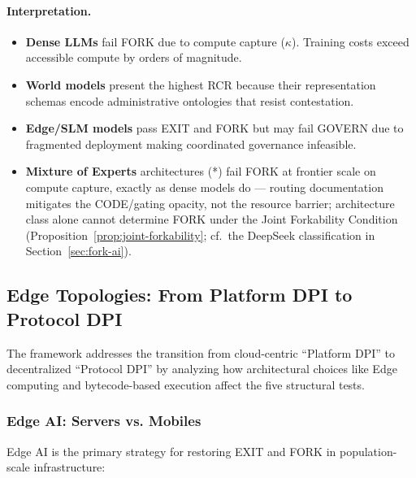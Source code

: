\documentclass{article}
\theoremstyle{definition}
\begin{document}
\paragraph{Interpretation.}
\begin{itemize}[noitemsep]
    \item \textbf{Dense LLMs} fail FORK due to compute capture ($\kappa$). Training costs exceed accessible compute by orders of magnitude.
    \item \textbf{World models} present the highest RCR because their representation schemas encode administrative ontologies that resist contestation.
    \item \textbf{Edge/SLM models} pass EXIT and FORK but may fail GOVERN due to fragmented deployment making coordinated governance infeasible.
    \item \textbf{Mixture of Experts} architectures (*) fail FORK at frontier scale on compute capture, exactly as dense models do --- routing documentation mitigates the CODE/gating opacity, not the resource barrier; architecture class alone cannot determine FORK under the Joint Forkability Condition (Proposition~\ref{prop:joint-forkability}; cf.\ the DeepSeek classification in Section~\ref{sec:fork-ai}).
\end{itemize}

\subsection{Edge Topologies: From Platform DPI to Protocol DPI}

The framework addresses the transition from cloud-centric ``Platform DPI'' to decentralized ``Protocol DPI'' by analyzing how architectural choices like Edge computing and bytecode-based execution affect the five structural tests.

\subsubsection{Edge AI: Servers vs. Mobiles}

Edge AI is the primary strategy for restoring EXIT and FORK in population-scale infrastructure:
\end{document}

